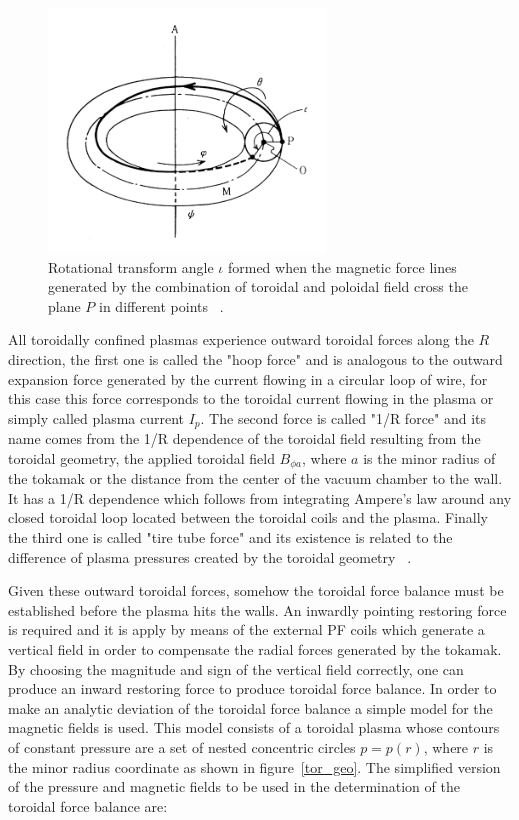 \begin{figure}
	\centering
	\includegraphics[width=0.655\textwidth]{Chp1/rotational_angle.png}
	\caption{Rotational transform angle $\iota$ formed when the magnetic force lines generated by the combination of toroidal and poloidal field cross the plane $P$ in different points  ~\cite[Chapter~3]{Miyamoto2011}. \label{rot_angle}}
\end{figure}

 All toroidally confined plasmas experience  outward toroidal forces along the $R$ direction, the first one is called the "hoop force" and is analogous to  the outward expansion force generated by the current flowing in a circular loop of wire, for this case this force corresponds to the toroidal current flowing in the plasma or simply called plasma current $I_p$. The second force is called "1/R force" and its name comes from the 1/R dependence of the toroidal field resulting from the toroidal geometry, the applied toroidal field $B_{\phi a}$,  where $a$ is the minor radius of the tokamak or the distance from the center of the vacuum chamber to the wall. It has a 1/R dependence which follows from integrating Ampere's law around any closed toroidal loop located between the toroidal coils and the plasma. Finally the third one is called "tire tube force" and its existence is related to the difference of plasma pressures created by the toroidal geometry ~\cite[Chapter~11]{Freidberg2007}. \smallskip 
 
Given these outward toroidal forces, somehow the  toroidal force balance must be established before the plasma hits the walls. An inwardly pointing restoring force is required and it is apply by means of the external PF coils which generate a vertical field in order to compensate the radial forces generated by the tokamak.  By choosing the magnitude and sign of the vertical field correctly, one can produce an inward restoring force to produce toroidal force balance. In order to make an analytic deviation of the toroidal force balance a simple model for the magnetic fields is used. This model consists of a toroidal plasma whose contours of constant pressure are a set of nested concentric circles $p=p(r)$, where $r$ is the minor radius coordinate as shown in figure~\ref{tor_geo}. The simplified version of the pressure and magnetic fields to be used in the determination of the toroidal force balance are:

